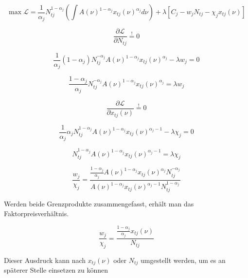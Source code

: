 \begin{equation*}
\max{\mathcal{L}}=\frac{1}{\alpha_j}N_{tj}^{1-\alpha_j}\left(\int{A(\nu)^{1-\alpha_j}x_{tj}(\nu)^{\alpha_j}d\nu}\right)+\lambda[C_j-w_jN_{tj}-\chi_{j}x_{tj}(\nu)]
\end{equation*} 


\begin{equation*}
\frac{\partial \mathcal{L}}{\partial N_{tj}} \overset{!}{=} 0
\end{equation*}


\begin{equation*}
\frac{1}{\alpha_j}(1-\alpha_j)N_{tj}^{-\alpha_j}A(\nu)^{1-\alpha_j}x_{tj}(\nu)^{\alpha_j}-\lambda w_j = 0
\end{equation*}


\begin{equation}
\frac{1-\alpha_j}{\alpha_j}N_{tj}^{-\alpha_j}A(\nu)^{1-\alpha_j}x_{tj}(\nu)^{\alpha_j}=\lambda w_j
\end{equation}


\begin{equation*}
\frac{\partial \mathcal{L}}{\partial x_{tj}(\nu)} \overset{!}{=} 0
\end{equation*}


\begin{equation*}
\frac{1}{\alpha_j}\alpha_jN_{tj}^{1-\alpha_j}A(\nu)^{1-\alpha_j}x_{tj}(\nu)^{\alpha_j-1}-\lambda \chi_j = 0
\end{equation*}


\begin{equation}
N_{tj}^{1-\alpha_j}A(\nu)^{1-\alpha_j}x_{tj}(\nu)^{\alpha_j-1}=\lambda \chi_j
\end{equation}


\begin{equation}
\frac{w_j}{\chi_j}=\frac{\frac{1-\alpha_j}{\alpha_j}A(\nu)^{1-\alpha_j}x_{tj}(\nu)^{\alpha_j} N_{tj}^{-\alpha_j}}{A(\nu)^{1-\alpha_j}x_{tj}(\nu)^{\alpha_j-1}N_{tj}^{1-\alpha_j}}
\end{equation}


Werden beide Grenzprodukte zusammengefasst, erhält man das Faktorpreisverhältnis. 


\begin{equation}
\frac{w_j}{\chi_j}=\frac{\frac{1-\alpha_j}{\alpha_j}x_{tj}(\nu)}{N_{tj}}
\end{equation}


Dieser Ausdruck kann nach $x_{tj}(\nu)$ oder $N_{tj}$ umgestellt werden, um es an späterer Stelle einsetzen zu können

